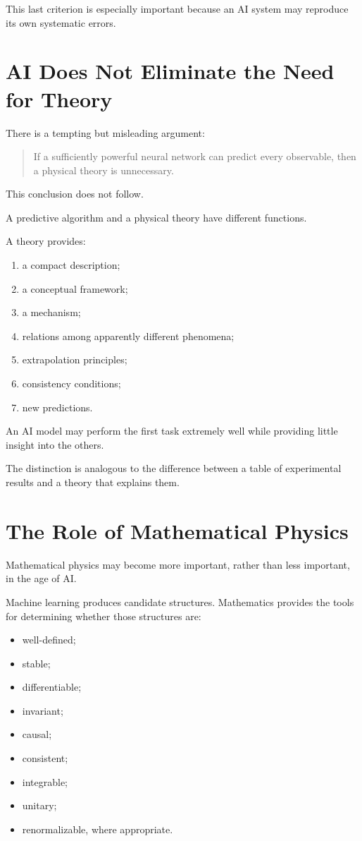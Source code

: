 \documentclass[11pt,a4paper]{article}
\begin{document}
This last criterion is especially important because an AI system may reproduce
its own systematic errors.

\section{AI Does Not Eliminate the Need for Theory}

There is a tempting but misleading argument:

\begin{quote}
If a sufficiently powerful neural network can predict every observable, then a
physical theory is unnecessary.
\end{quote}

This conclusion does not follow.

A predictive algorithm and a physical theory have different functions.

A theory provides:

\begin{enumerate}
\item a compact description;
\item a conceptual framework;
\item a mechanism;
\item relations among apparently different phenomena;
\item extrapolation principles;
\item consistency conditions;
\item new predictions.
\end{enumerate}

An AI model may perform the first task extremely well while providing little
insight into the others.

The distinction is analogous to the difference between a table of experimental
results and a theory that explains them.

\section{The Role of Mathematical Physics}

Mathematical physics may become more important, rather than less important, in
the age of AI.

Machine learning produces candidate structures. Mathematics provides the tools
for determining whether those structures are:

\begin{itemize}
\item well-defined;
\item stable;
\item differentiable;
\item invariant;
\item causal;
\item consistent;
\item integrable;
\item unitary;
\item renormalizable, where appropriate.
\end{itemize}
\end{document}
